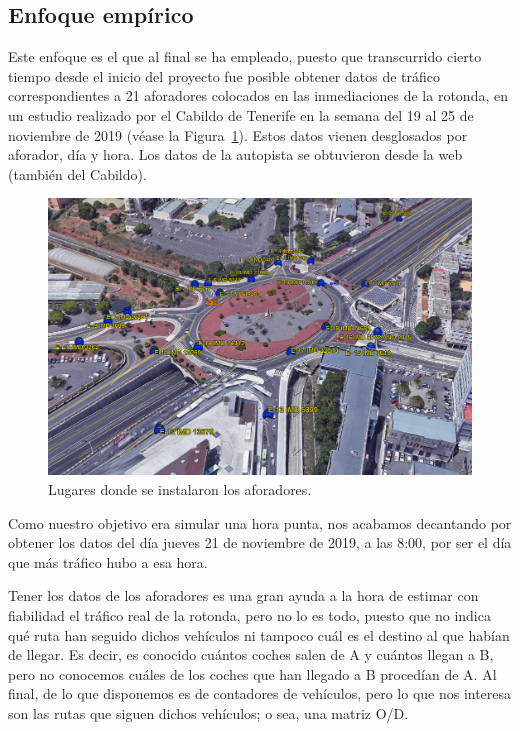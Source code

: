 \subsection{Enfoque empírico}

Este enfoque es el que al final se ha empleado, puesto que transcurrido cierto tiempo desde el inicio del proyecto fue posible obtener datos de tráfico correspondientes a 21 aforadores colocados en las inmediaciones de la rotonda, en un estudio realizado por el Cabildo de Tenerife en la semana del 19 al 25 de noviembre de 2019 (véase la Figura~\ref{fig:aforadores}). Estos datos vienen desglosados por aforador, día y hora. Los datos de la autopista se obtuvieron desde la web (también del Cabildo).

\begin{figure}[ht]
    \centering
    \includegraphics[width=\textwidth]{report/images/aforadores.png}
    \caption{Lugares donde se instalaron los aforadores.}
    \label{fig:aforadores}
\end{figure}

Como nuestro objetivo era simular una hora punta, nos acabamos decantando por obtener los datos del día jueves 21 de noviembre de 2019, a las 8:00, por ser el día que más tráfico hubo a esa hora.

Tener los datos de los aforadores es una gran ayuda a la hora de estimar con fiabilidad el tráfico real de la rotonda, pero no lo es todo, puesto que no indica qué ruta han seguido dichos vehículos ni tampoco cuál es el destino al que habían de llegar. Es decir, es conocido cuántos coches salen de A y cuántos llegan a B, pero no conocemos cuáles de los coches que han llegado a B procedían de A. Al final, de lo que disponemos es de contadores de vehículos, pero lo que nos interesa son las rutas que siguen dichos vehículos; o sea, una matriz O/D.

